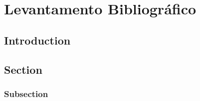 \chapter{Levantamento Bibliográfico}

\section{Introduction}

\lipsum[1-4]

\section{Section}

\lipsum[2-4]

\subsection{Subsection}

\lipsum[2-4]
